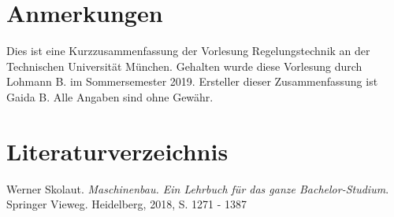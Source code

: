 \documentclass[10pt,a4paper]{article}
\renewcommand{\arraystretch}{1.5}
\begin{document}
\renewcommand{\arraystretch}{1.5}



\pagebreak
\section*{Anmerkungen}
Dies ist eine Kurzzusammenfassung der Vorlesung Regelungstechnik an der Technischen Universität München.
Gehalten wurde diese Vorlesung durch Lohmann B. im Sommersemester 2019.
Ersteller dieser Zusammenfassung ist Gaida B.
Alle Angaben sind ohne Gewähr.


\section*{Literaturverzeichnis}
Werner Skolaut. \textit{Maschinenbau. Ein Lehrbuch für das ganze Bachelor-Studium}. Springer Vieweg. Heidelberg, 2018, S. 1271 - 1387
\end{document}
